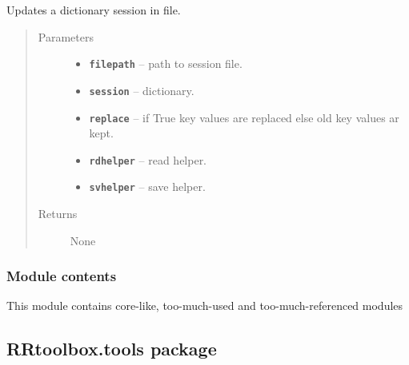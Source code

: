 \documentclass[letterpaper,10pt,english]{sphinxmanual}
\begin{document}

\begin{fulllineitems}
\label{RRtoolbox.lib:RRtoolbox.lib.session.updateSession}
Updates a dictionary session in file.
\begin{quote}\begin{description}
\item[{Parameters}] \leavevmode\begin{itemize}
\item {} 
\textbf{\texttt{filepath}} -- path to session file.

\item {} 
\textbf{\texttt{session}} -- dictionary.

\item {} 
\textbf{\texttt{replace}} -- if True key values are replaced else old key values ar kept.

\item {} 
\textbf{\texttt{rdhelper}} -- read helper.

\item {} 
\textbf{\texttt{svhelper}} -- save helper.

\end{itemize}

\item[{Returns}] \leavevmode
None

\end{description}\end{quote}

\end{fulllineitems}



\subsubsection{Module contents}
\label{RRtoolbox.lib:module-RRtoolbox.lib}\label{RRtoolbox.lib:module-contents}
This module contains core-like, too-much-used and too-much-referenced modules


\subsection{RRtoolbox.tools package}
\label{RRtoolbox.tools::doc}\label{RRtoolbox.tools:rrtoolbox-tools-package}
\end{document}
